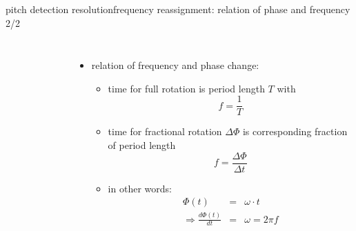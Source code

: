         \begin{frame}{pitch detection resolution}{frequency reassignment: relation of phase and frequency 2/2}

            \begin{columns}
                \begin{figure}
                \begin{tiny}
                \end{tiny}
                \end{figure}
            \begin{itemize}
                \item   relation of frequency and phase change:
                    \begin{itemize}
                        \item<2-> time for full rotation is period length $T$ with \[f = \frac{1}{T}\]
                        \item<3-> time for fractional rotation $\Delta\Phi$ is corresponding fraction of period length \[f = \frac{\Delta\Phi}{\Delta t}\]
                        \item<4-> in other words: 
                        \begin{eqnarray*}
                            \Phi(t) &=& \omega\cdot t\\
                            \Rightarrow \frac{d\Phi(t)}{dt} &=& \omega = 2\pi f
                        \end{eqnarray*}
                    \end{itemize}
            \end{itemize}
            \end{columns}
        \end{frame}
